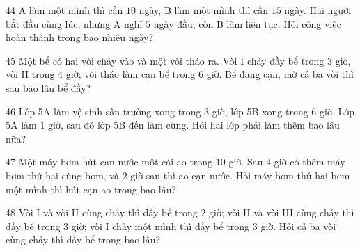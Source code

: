 \gap
\begin{probbox}{44}{}
A làm một mình thì cần $10$ ngày, B làm một mình thì cần $15$ ngày. Hai người bắt đầu cùng lúc, nhưng A nghỉ $5$ ngày đầu, còn B làm liên tục. Hỏi công việc hoàn thành trong bao nhiêu ngày?
\end{probbox}
\gap
\begin{probbox}{45}{}
Một bể có hai vòi chảy vào và một vòi tháo ra. Vòi I chảy đầy bể trong $3$ giờ, vòi II trong $4$ giờ; vòi tháo làm cạn bể trong $6$ giờ. Bể đang cạn, mở cả ba vòi thì sau bao lâu bể đầy?
\end{probbox}
\gap
\begin{probbox}{46}{}
Lớp 5A làm vệ sinh sân trường xong trong $3$ giờ, lớp 5B xong trong $6$ giờ. Lớp 5A làm $1$ giờ, sau đó lớp 5B đến làm cùng. Hỏi hai lớp phải làm thêm bao lâu nữa?
\end{probbox}
\gap
\begin{probbox}{47}{}
Một máy bơm hút cạn nước một cái ao trong $10$ giờ. Sau $4$ giờ có thêm máy bơm thứ hai cùng bơm, và $2$ giờ sau thì ao cạn nước. Hỏi máy bơm thứ hai bơm một mình thì hút cạn ao trong bao lâu?
\end{probbox}
\gap
\begin{probbox}{48}{}
Vòi I và vòi II cùng chảy thì đầy bể trong $2$ giờ; vòi II và vòi III cùng chảy thì đầy bể trong $3$ giờ; vòi I chảy một mình thì đầy bể trong $3$ giờ. Hỏi cả ba vòi cùng chảy thì đầy bể trong bao lâu?
\end{probbox}
